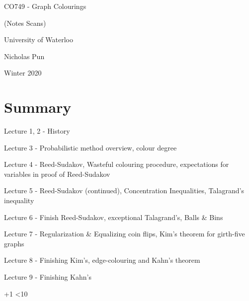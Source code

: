 \documentclass[12pt]{article}
\newcommand{\includelecture}[1]{
  
  
  \clearpage
}
\begin{document}
\begin{titlepage}
  \centering
  \vspace*{2in}
  {\huge CO749 - Graph Colourings}\par
  {\Large (Notes Scans)}\par
  \vspace{0.3in}
  {\large University of Waterloo}\par
  {\large Nicholas Pun}\par
  {\large Winter 2020}\par 
\end{titlepage}
 
\tableofcontents
\clearpage

\section*{Summary}
Lecture 1, 2 - History

Lecture 3 - Probabilistic method overview, colour degree

Lecture 4 - Reed-Sudakov, Wasteful colouring procedure, expectations for variables in proof of Reed-Sudakov

Lecture 5 - Reed-Sudakov (continued), Concentration Inequalities, Talagrand's inequality

Lecture 6 - Finish Reed-Sudakov, exceptional Talagrand's, Balls \& Bins

Lecture 7 - Regularization \& Equalizing coin flips, Kim's theorem for girth-five graphs

Lecture 8 - Finishing Kim's, edge-colouring and Kahn's theorem

Lecture 9 - Finishing Kahn's

\clearpage

\newcount\lecNum
{}
\loop
  \includelecture{sections/lec\the\lecNum.pdf}
  \advance \lecNum +1
\ifnum \lecNum<10
\repeat


\nocite{*}


\end{document}

